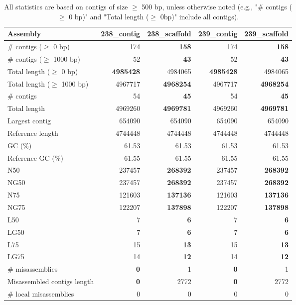 \documentclass[12pt,a4paper]{article}
\begin{document}
\begin{table}[ht]
\begin{center}
\caption{All statistics are based on contigs of size $\geq$ 500 bp, unless otherwise noted (e.g., "\# contigs ($\geq$ 0 bp)" and "Total length ($\geq$ 0bp)" include all contigs).}
\begin{tabular}{|l*{4}{|r}|}
\hline
Assembly & 238\_contig & 238\_scaffold & 239\_contig & 239\_scaffold \\ \hline
\# contigs ($\geq$ 0 bp) & 174 & {\bf 158} & 174 & {\bf 158} \\ \hline
\# contigs ($\geq$ 1000 bp) & 52 & {\bf 43} & 52 & {\bf 43} \\ \hline
Total length ($\geq$ 0 bp) & {\bf 4985428} & 4984065 & {\bf 4985428} & 4984065 \\ \hline
Total length ($\geq$ 1000 bp) & 4967717 & {\bf 4968254} & 4967717 & {\bf 4968254} \\ \hline
\# contigs & 54 & {\bf 45} & 54 & {\bf 45} \\ \hline
Total length & 4969260 & {\bf 4969781} & 4969260 & {\bf 4969781} \\ \hline
Largest contig & 654090 & 654090 & 654090 & 654090 \\ \hline
Reference length & 4744448 & 4744448 & 4744448 & 4744448 \\ \hline
GC (\%) & 61.53 & 61.53 & 61.53 & 61.53 \\ \hline
Reference GC (\%) & 61.55 & 61.55 & 61.55 & 61.55 \\ \hline
N50 & 237457 & {\bf 268392} & 237457 & {\bf 268392} \\ \hline
NG50 & 237457 & {\bf 268392} & 237457 & {\bf 268392} \\ \hline
N75 & 121603 & {\bf 137136} & 121603 & {\bf 137136} \\ \hline
NG75 & 122207 & {\bf 137898} & 122207 & {\bf 137898} \\ \hline
L50 & 7 & {\bf 6} & 7 & {\bf 6} \\ \hline
LG50 & 7 & {\bf 6} & 7 & {\bf 6} \\ \hline
L75 & 15 & {\bf 13} & 15 & {\bf 13} \\ \hline
LG75 & 14 & {\bf 12} & 14 & {\bf 12} \\ \hline
\# misassemblies & {\bf 0} & 1 & {\bf 0} & 1 \\ \hline
Misassembled contigs length & {\bf 0} & 2772 & {\bf 0} & 2772 \\ \hline
\# local misassemblies & 0 & 0 & 0 & 0 \\ \hline

\end{tabular}
\end{center}
\end{table}
\end{document}
